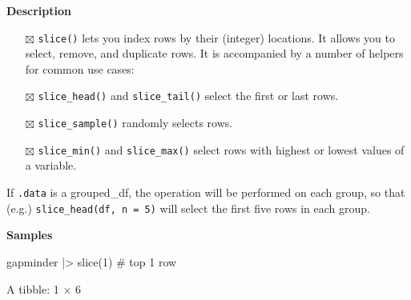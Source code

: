 \documentclass[
  letterpaper,
  DIV=11,
  numbers=noendperiod]{scrreprt}
\newenvironment{Shaded}{\begin{snugshade}}{\end{snugshade}}
\newcommand{\CommentTok}[1]{\textcolor[rgb]{0.37,0.37,0.37}{#1}}
\newcommand{\DecValTok}[1]{\textcolor[rgb]{0.68,0.00,0.00}{#1}}
\newcommand{\FunctionTok}[1]{\textcolor[rgb]{0.28,0.35,0.67}{#1}}
\newcommand{\NormalTok}[1]{\textcolor[rgb]{0.00,0.23,0.31}{#1}}
\newcommand{\SpecialCharTok}[1]{\textcolor[rgb]{0.37,0.37,0.37}{#1}}
\providecommand{\tightlist}{%
  \setlength{\itemsep}{0pt}\setlength{\parskip}{0pt}}\usepackage{longtable,booktabs,array}
\begin{document}
\textbf{Description}

\begin{itemize}
\tightlist
\item[$\boxtimes$]
  \texttt{slice()} lets you index rows by their (integer) locations. It
  allows you to select, remove, and duplicate rows. It is accompanied by
  a number of helpers for common use cases:
\item[$\boxtimes$]
  \texttt{slice\_head()} and \texttt{slice\_tail()} select the first or
  last rows.
\item[$\boxtimes$]
  \texttt{slice\_sample()} randomly selects rows.
\item[$\boxtimes$]
  \texttt{slice\_min()} and \texttt{slice\_max()} select rows with
  highest or lowest values of a variable.
\end{itemize}

If \texttt{.data} is a grouped\_df, the operation will be performed on
each group, so that (e.g.) \texttt{slice\_head(df,\ n\ =\ 5)} will
select the first five rows in each group.

\textbf{Samples}

\begin{Shaded}
\begin{Highlighting}[]
\NormalTok{gapminder }\SpecialCharTok{|\textgreater{}} \FunctionTok{slice}\NormalTok{(}\DecValTok{1}\NormalTok{) }\CommentTok{\# top 1 row}
\end{Highlighting}
\end{Shaded}

A tibble: 1 × 6
\end{document}
